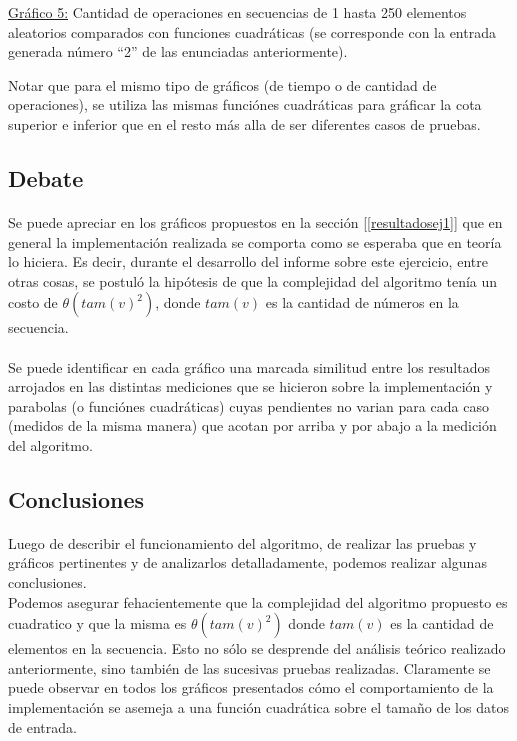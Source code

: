 \underline{Gráfico 5:} Cantidad de operaciones en secuencias de 1 hasta 250 elementos aleatorios comparados con funciones cuadráticas (se corresponde con la entrada generada número ``2'' de las enunciadas anteriormente).



Notar que para el mismo tipo de gráficos (de tiempo o de cantidad de operaciones), se utiliza las mismas funciónes cuadráticas para gráficar la cota superior e inferior que en el resto más alla de ser diferentes casos de pruebas. 




\subsection{Debate}
\paragraph{}
Se puede apreciar en los gráficos propuestos en la sección [\ref{resultadosej1}] que en general la implementación realizada se comporta como se esperaba que en teoría lo hiciera. Es decir, durante el desarrollo del informe sobre este ejercicio, entre otras cosas, se postuló la hipótesis de que la complejidad del algoritmo tenía un costo de $\theta(tam(v)^2)$, donde $tam(v)$ es la cantidad de números en la secuencia.

\paragraph{}
Se puede identificar en cada gráfico una marcada similitud entre los resultados arrojados en las distintas mediciones que se hicieron sobre la implementación y parabolas (o funciónes cuadráticas) cuyas pendientes no varian para cada caso (medidos de la misma manera) que acotan por arriba y por abajo a la medición del algoritmo.


\paragraph{}


\subsection{Conclusiones}
\paragraph{}
Luego de describir el funcionamiento del algoritmo, de realizar las pruebas y gráficos pertinentes y de analizarlos detalladamente, podemos realizar algunas conclusiones.\\
Podemos asegurar fehacientemente que la complejidad del algoritmo propuesto es cuadratico y que la misma es $\theta(tam(v)^2)$ donde $tam(v)$ es la cantidad de elementos en la secuencia. Esto no sólo se desprende del análisis teórico realizado anteriormente, sino también de las sucesivas pruebas realizadas. Claramente se puede observar en todos los gráficos presentados cómo el comportamiento de la implementación se asemeja a una función cuadrática sobre el tamaño de los datos de entrada.

